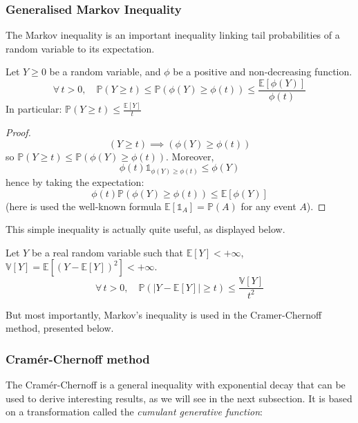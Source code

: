 \subsubsection{Generalised Markov Inequality}

The Markov inequality is an important inequality linking tail probabilities of a random variable to its expectation.

\begin{thm}
  Let $Y \geq 0$ be a random variable, and $\phi$ be a positive and non-decreasing function.
  $$\forall \, t > 0,\quad \mathbb{P}(Y \geq t) \leq \mathbb{P}(\phi(Y) \geq \phi(t)) \leq \frac{\mathbb{E}[\phi(Y)]}{\phi(t)}$$
  In particular: $\mathbb{P}(Y \geq t) \leq \frac{\mathbb{E}[Y]}{t}$
\end{thm}

\begin{proof}
  $$(Y \geq t) \implies (\phi(Y) \geq \phi(t))$$ so $\mathbb{P}(Y \geq t) \leq \mathbb{P}(\phi(Y) \geq \phi(t))$. Moreover, $$\phi(t) \mathbb{1}_{\phi(Y) \geq \phi(t)} \leq \phi(Y)$$ hence by taking the expectation: $$\phi(t) \mathbb{P}(\phi(Y) \geq \phi(t)) \leq \mathbb{E}[\phi(Y)]$$ (here is used the well-known formula $\mathbb{E}[\mathbb{1}_{A}] = \mathbb{P}(A)$ for any event $A$).
\end{proof}

This simple inequality is actually quite useful, as displayed below.

\begin{thm}
  Let $Y$ be a real random variable such that $\mathbb{E}[Y] < +\infty$, $\mathbb{V}[Y] = \mathbb{E}[(Y - \mathbb{E}[Y])^2] < +\infty$.
  $$\forall \, t > 0,\quad \mathbb{P}(|Y - \mathbb{E}[Y]| \geq t) \leq \frac{\mathbb{V}[Y]}{t^2}$$
\end{thm}

But most importantly, Markov's inequality is used in the Cramer-Chernoff method, presented below.

\subsubsection{Cramér-Chernoff method}

The Cramér-Chernoff is a general inequality with exponential decay that can be used to derive interesting results, as we will see in the next subsection. It is based on a transformation called the \emph{cumulant generative function}:

